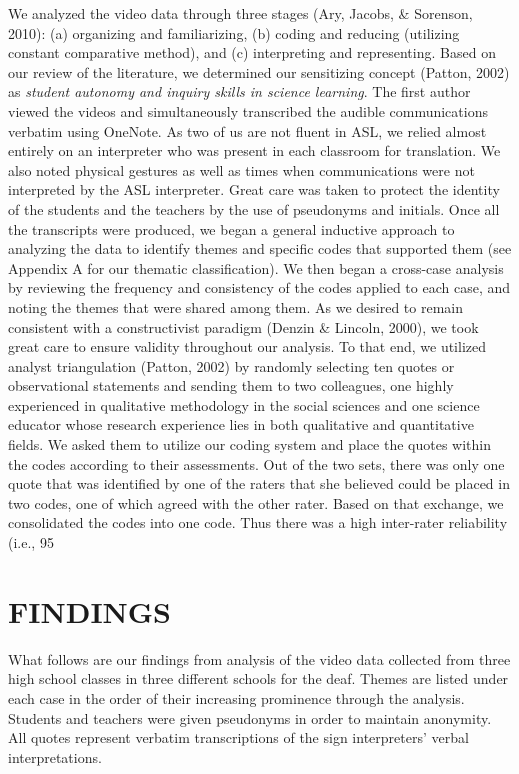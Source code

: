 \documentclass[11.5pt]{sig-alternate} %
\begin{document}
\begin{large}
We analyzed the video data through three stages (Ary, Jacobs, \& Sorenson, 2010):  (a) organizing and familiarizing, (b) coding and reducing (utilizing constant comparative method), and (c) interpreting and representing.   Based on our review of the literature, we determined our sensitizing concept (Patton, 2002) as \textit{student autonomy and inquiry skills in science learning}.  The first author viewed the videos and simultaneously transcribed the audible communications verbatim using OneNote. As two of us are not fluent in ASL, we relied almost entirely on an interpreter who was present in each classroom for translation.  We also noted physical gestures as well as times when communications were not interpreted by the ASL interpreter. Great care was taken to protect the identity of the students and the teachers by the use of pseudonyms and initials.  Once all the transcripts were produced, we began a general inductive approach to analyzing the data to identify themes and specific codes that supported them (see Appendix A for our thematic classification). We then began a cross-case analysis by reviewing the frequency and consistency of the codes applied to each case, and noting the themes that were shared among them.  As we desired to remain consistent with a constructivist paradigm (Denzin \& Lincoln, 2000), we took great care to ensure validity throughout our analysis. To that end, we utilized analyst triangulation (Patton, 2002) by randomly selecting ten quotes or observational statements and sending them to two colleagues, one highly experienced in qualitative methodology in the social sciences and one science educator whose research experience lies in both qualitative and quantitative fields.  We asked them to utilize our coding system and place the quotes within the codes according to their assessments.  Out of the two sets, there was only one quote that was identified by one of the raters that she believed could be placed in two codes, one of which agreed with the other rater.  Based on that exchange, we consolidated the codes into one code.  Thus there was a high inter-rater reliability (i.e., 95%

\section*{FINDINGS}

What follows are our findings from analysis of the video data collected from three high school classes in three different schools for the deaf.  Themes are listed under each case in the order of their increasing prominence through the analysis.  Students and teachers were given pseudonyms in order to maintain anonymity.  All quotes represent verbatim transcriptions of the sign interpreters’ verbal interpretations. 


\end{large}
\end{document}
